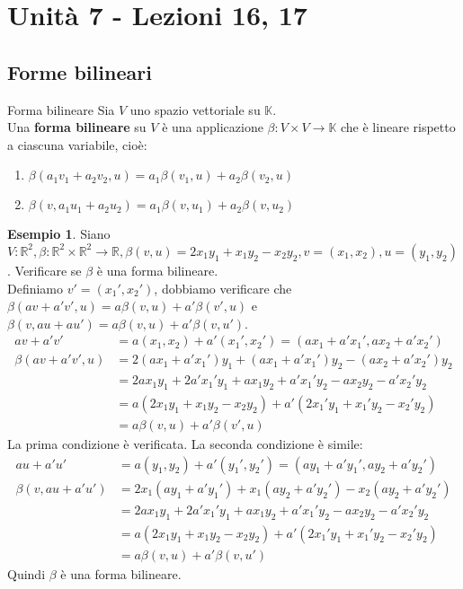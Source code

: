 \documentclass[a4paper]{article}
\theoremstyle{definition}
\newtheorem*{es}{Esempio}
\begin{document}
	\section{Unità 7  - Lezioni 16, 17}
	\subsection{Forme bilineari}
	\begin{deff}{Forma bilineare}{}
		Sia $V$ uno spazio vettoriale su $\mathbb{K}$. \\
		Una \textbf{forma bilineare} su $V$ è una applicazione $\beta: V \times V \to \mathbb{K}$ che è lineare rispetto a ciascuna variabile, cioè:
		\begin{enumerate}
			\item $\beta(a_1v_1 + a_2v_2, u) = a_1\beta(v_1, u) + a_2\beta(v_2, u)$
			\item $\beta(v, a_1u_1 + a_2u_2) = a_1\beta(v, u_1) + a_2\beta(v, u_2)$
		\end{enumerate}
	\end{deff}

	\begin{es}
		Siano $V: \mathbb{R}^2, \beta: \mathbb{R}^2 \times \mathbb{R}^2 \to \mathbb{R}, \beta(v, u) = 2x_1y_1 + x_1y_2 - x_2y_2, v = (x_1, x_2), u = (y_1, y_2)$.
		Verificare se $\beta$ è una forma bilineare. \\
		Definiamo $v' = (x_1', x_2')$, dobbiamo verificare che $\beta(av + a'v', u) = a\beta(v, u) + a'\beta(v', u)$ e $\beta(v, au + au') = a\beta(v, u) + a'\beta(v, u')$.
		\begin{align*}
			av + a'v' &= a(x_1, x_2) + a'(x_1', x_2') = (ax_1 + a'x_1', ax_2 + a'x_2') \\
			\beta(av + a'v', u) &= 2(ax_1 + a'x_1')y_1 + (ax_1 + a'x_1')y_2 - (ax_2 + a'x_2')y_2 \\
			&= 2ax_1y_1 + 2a'x_1'y_1 + ax_1y_2 + a'x_1'y_2 - ax_2y_2 - a'x_2'y_2 \\
			&= a(2x_1y_1 + x_1y_2 - x_2y_2) + a'(2x_1'y_1 + x_1'y_2 - x_2'y_2) \\
			&= a\beta(v, u) + a'\beta(v', u)
		\end{align*}
		La prima condizione è verificata. La seconda condizione è simile:
		\begin{align*}
			au + a'u' &= a(y_1, y_2) + a'(y_1', y_2') = (ay_1 + a'y_1', ay_2 + a'y_2') \\
			\beta(v, au + a'u') &= 2x_1(ay_1 + a'y_1') + x_1(ay_2 + a'y_2') - x_2(ay_2 + a'y_2') \\
			&= 2ax_1y_1 + 2a'x_1'y_1 + ax_1y_2 + a'x_1'y_2 - ax_2y_2 - a'x_2'y_2 \\
			&= a(2x_1y_1 + x_1y_2 - x_2y_2) + a'(2x_1'y_1 + x_1'y_2 - x_2'y_2) \\
			&= a\beta(v, u) + a'\beta(v, u')
		\end{align*}
		Quindi $\beta$ è una forma bilineare.
	\end{es}
\end{document}
